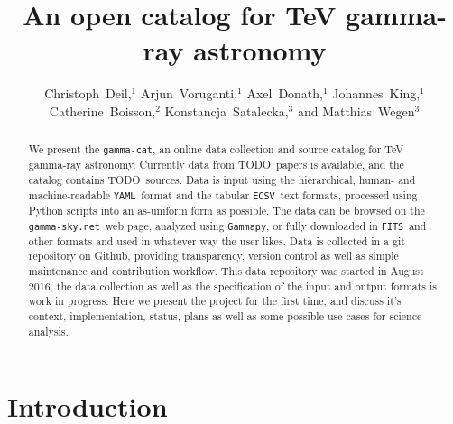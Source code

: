 \documentclass[11pt,twoside]{article}
\newcommand{\gammacat}{\texttt{gamma-cat}}
\newcommand{\gammapy}{\texttt{Gammapy}}
\newcommand{\gammasky}{\texttt{gamma-sky.net}}
\newcommand{\nsources}{TODO}
\newcommand{\npapers}{TODO}
\newcommand{\yaml}{\texttt{YAML}}
\newcommand{\ecsv}{\texttt{ECSV}}
\newcommand{\fits}{\texttt{FITS}}
\begin{document}
\title{An open catalog for TeV gamma-ray astronomy}

\author{Christoph~Deil,$^1$
Arjun~Voruganti,$^1$
Axel~Donath,$^1$
Johannes~King,$^1$
Catherine~Boisson,$^2$
Konstancja~Satalecka,$^3$
and Matthias~Wegen$^3$
}


\begin{abstract}

We present the \gammacat, an online data collection and source catalog for TeV
gamma-ray astronomy. Currently data from \npapers~papers is available, and the
catalog contains \nsources~sources. Data is input using the hierarchical, human-
and machine-readable \yaml\ format and the tabular \ecsv\ text formats,
processed using Python scripts into an as-uniform form as possible. The data can
be browsed on the \gammasky~web page, analyzed using \gammapy, or fully
downloaded in \fits\ and other formats and used in whatever way the user likes.
Data is collected in a git repository on Github, providing transparency, version
control as well as simple maintenance and contribution workflow. This data
repository was started in August 2016, the data collection as well as the
specification of the input and output formats is work in progress. Here we
present the project for the first time, and discuss it's context,
implementation, status, plans as well as some possible use cases for science
analysis.

\end{abstract}

\section{Introduction}
\end{document}
